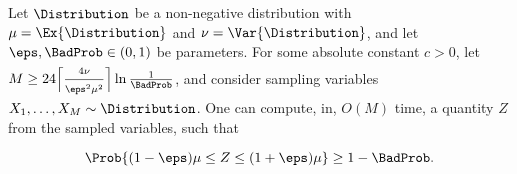 \begin{theorem}
    Let $\Distribution$ be a non-negative distribution with
    $\mu = \Ex{\Distribution}$ and $\nu = \Var{\Distribution}$, and
    let $\eps, \BadProb \in (0,1)$ be parameters.  For some absolute
    constant $c >0$, let
    $M \geq 24 \Bigl\lceil{ \frac{4 \nu\bigr.}{\eps^2\mu^2\bigr.}  }
    \Bigr\rceil \ln \frac{1}{\BadProb}$, and consider sampling
    variables $X_1, \ldots, X_M \sim \Distribution$. One can compute,
    in, $O(M)$ time, a quantity $Z$ from the sampled variables, such
    that
    \begin{equation*}
        \Prob{ (1-\eps)\mu \leq Z \leq (1+\eps)\mu \Bigr.} \geq 1 -
        \BadProb.
    \end{equation*}
\end{theorem}
